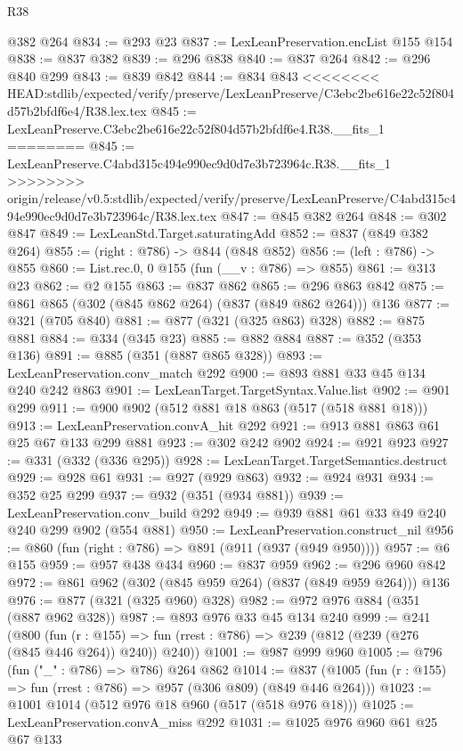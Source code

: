 \begin{lexlean}{R38}
\begin{coremodule}
{{{{{{{{{{{{    @382
    @264
@834 := @293 @23
@837 := LexLeanPreservation.encList @155 @154
@838 := @837 @382
@839 := @296 @838
@840 := @837 @264
@842 := @296 @840 @299
@843 := @839 @842
@844 := @834 @843
<<<<<<<< HEAD:stdlib/expected/verify/preserve/LexLeanPreserve/C3ebc2be616e22c52f804d57b2bfdf6e4/R38.lex.tex
@845 := LexLeanPreserve.C3ebc2be616e22c52f804d57b2bfdf6e4.R38.__fits_1
========
@845 := LexLeanPreserve.C4abd315c494e990ec9d0d7e3b723964c.R38.__fits_1
>>>>>>>> origin/release/v0.5:stdlib/expected/verify/preserve/LexLeanPreserve/C4abd315c494e990ec9d0d7e3b723964c/R38.lex.tex
@847 := @845 @382 @264
@848 := @302 @847
@849 := LexLeanStd.Target.saturatingAdd
@852 := @837 (@849 @382 @264)
@855 := (right : @786) -> @844 (@848 @852)
@856 := (left : @786) -> @855
@860 := List.rec.{0, 0} @155 (fun (__v : @786) => @855)
@861 := @313 @23
@862 := @2 @155
@863 := @837 @862
@865 := @296 @863 @842
@875 := @861 @865 (@302 (@845 @862 @264) (@837 (@849 @862 @264))) @136
@877 := @321 (@705 @840)
@881 := @877 (@321 (@325 @863) @328)
@882 := @875 @881
@884 := @334 (@345 @23)
@885 := @882 @884
@887 := @352 (@353 @136)
@891 := @885 (@351 (@887 @865 @328))
@893 := LexLeanPreservation.conv_match @292
@900 := @893 @881 @33 @45 @134 @240 @242 @863
@901 := LexLeanTarget.TargetSyntax.Value.list
@902 := @901 @299
@911 := @900 @902 (@512 @881 @18 @863 (@517 (@518 @881 @18)))
@913 := LexLeanPreservation.convA_hit @292
@921 := @913 @881 @863 @61 @25 @67 @133 @299 @881
@923 := @302 @242 @902
@924 := @921 @923
@927 := @331 (@332 (@336 @295))
@928 := LexLeanTarget.TargetSemantics.destruct
@929 := @928 @61
@931 := @927 (@929 @863)
@932 := @924 @931
@934 := @352 @25 @299
@937 := @932 (@351 (@934 @881))
@939 := LexLeanPreservation.conv_build @292
@949 := @939 @881 @61 @33 @49 @240 @240 @299 @902 (@554 @881)
@950 := LexLeanPreservation.construct_nil
@956 := @860 (fun (right : @786) => @891 (@911 (@937 (@949 @950))))
@957 := @6 @155
@959 := @957 @438 @434
@960 := @837 @959
@962 := @296 @960 @842
@972 := @861 @962 (@302 (@845 @959 @264) (@837 (@849 @959 @264))) @136
@976 := @877 (@321 (@325 @960) @328)
@982 := @972 @976 @884 (@351 (@887 @962 @328))
@987 := @893 @976 @33 @45 @134 @240
@999 := @241
    (@800
      (fun (r : @155) =>
      fun (rrest : @786) => @239 (@812 (@239 (@276 (@845 @446 @264)) @240)) @240))
@1001 := @987 @999 @960
@1005 := @796 (fun ("_" : @786) => @786) @264 @862
@1014 := @837 (@1005 (fun (r : @155) => fun (rrest : @786) => @957 (@306 @809) (@849 @446 @264)))
@1023 := @1001 @1014 (@512 @976 @18 @960 (@517 (@518 @976 @18)))
@1025 := LexLeanPreservation.convA_miss @292
@1031 := @1025 @976 @960 @61 @25 @67 @133
}}}}}}}}}}}}
\end{coremodule}
\end{lexlean}
